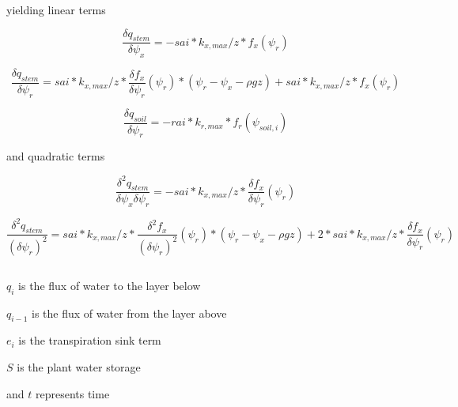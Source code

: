 \documentclass[11pt, oneside]{article}   	%
\begin{document}
yielding linear terms

\begin{equation}
\dfrac{\delta q_{stem}}{\delta \psi_x}=-sai*k_{x,max}/z*f_x\left(\psi_{r}\right)
\end{equation}

\begin{equation}
\dfrac{\delta q_{stem}}{\delta \psi_r}=sai*k_{x,max}/z*\dfrac{\delta f_x}{\delta\psi_r}\left(\psi_{r}\right)*\left(\psi_r-\psi_{x}-\rho gz\right)+sai*k_{x,max}/z*f_x\left(\psi_{r}\right)
\end{equation}

\begin{equation}
\dfrac{\delta q_{soil}}{\delta \psi_r}=-rai*k_{r,max}*f_r\left(\psi_{soil,i}\right)
\end{equation}

and quadratic terms

\begin{equation}
\dfrac{\delta^2 q_{stem}}{\delta \psi_x\delta\psi_r}=-sai*k_{x,max}/z*\dfrac{\delta f_x}{\delta\psi_r}\left(\psi_{r}\right)
\end{equation}

\begin{equation}
\dfrac{\delta^2 q_{stem}}{\left(\delta \psi_r\right)^2}=sai*k_{x,max}/z*\dfrac{\delta^2 f_x}{\left(\delta\psi_r\right)^2}\left(\psi_{r}\right)*\left(\psi_r-\psi_{x}-\rho gz\right)+2*sai*k_{x,max}/z*\dfrac{\delta f_x}{\delta\psi_r}\left(\psi_{r}\right)
\end{equation}

\begin{equation}
\end{equation}







$q_i$ is the flux of water to the layer below

$q_{i-1}$ is the flux of water from the layer above

$e_i$ is the transpiration sink term

$S$ is the plant water storage

and $t$ represents time
\end{document}
